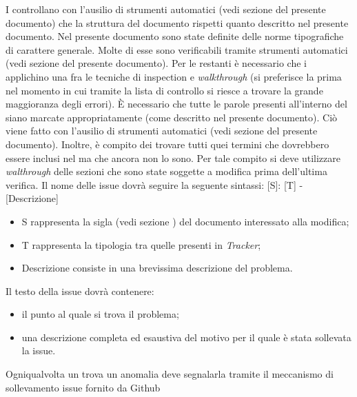 				I  controllano con l'ausilio di strumenti automatici (vedi sezione  del presente 
				documento) che la struttura del documento rispetti quanto descritto nel presente documento.
				Nel presente documento sono state definite delle norme tipografiche di carattere generale. Molte di esse sono verificabili tramite 
				strumenti automatici (vedi sezione  del presente documento). Per le restanti è necessario che i 
				 applichino una fra le tecniche di inspection e \textit{walkthrough}	(si preferisce la prima nel momento in cui 
				tramite la lista di controllo si riesce a trovare la grande maggioranza degli errori).
				È necessario che tutte le parole presenti all'interno del  siano marcate appropriatamente (come descritto nel presente 
				documento). Ciò viene fatto con l'ausilio di strumenti automatici (vedi sezione  del presente documento). 
				Inoltre, è compito dei  trovare tutti quei termini che dovrebbero essere inclusi nel  ma che 
				ancora non lo sono. Per tale compito si deve utilizzare \textit{walthrough} delle sezioni che sono state soggette a modifica prima 
				dell'ultima verifica.
		\label{sec:sintassiissue}
			Il nome delle issue dovrà seguire la seguente sintassi: [S]: [T] - [Descrizione]
			\begin{itemize}
				\item S rappresenta la sigla (vedi sezione ) del documento interessato alla modifica;
				\item T rappresenta la tipologia tra quelle presenti in \textit{Tracker};
				\item Descrizione consiste in una brevissima descrizione del problema.
			\end{itemize}
			Il testo della issue dovrà contenere:
			\begin{itemize}
				\item il punto al quale si trova il problema;
				\item una descrizione completa ed esaustiva del motivo per il quale è stata sollevata la issue.
			\end{itemize}
			Ogniqualvolta un  trova un anomalia deve segnalarla tramite il meccanismo di sollevamento issue fornito da Github 
